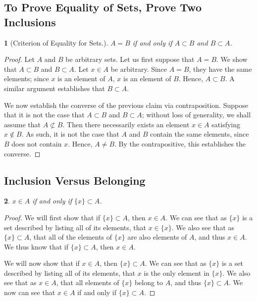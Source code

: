 \documentclass{book}
\newtheorem{majorEx}{}[section]
\begin{document}
			\subsection{To Prove Equality of Sets, Prove Two Inclusions}%
            	\begin{majorEx} %
                	[Criterion of Equality for Sets.]
                    $A = B$ if and only if $A \subset B$ and $B \subset A$.
                \end{majorEx}
                \begin{proof}
					Let $A$ and $B$ be arbitrary sets. Let us first suppose that $A = B$. We show that $A \subset B$ and $B \subset A$. Let $x \in A$ be arbitrary. Since $A = B$, they have the same elements; since $x$ is an element of $A$, $x$ is an element of $B$. Hence, $A \subset B$. A similar argument establishes that $B \subset A$.
                    
                    We now establish the converse of the previous claim via contraposition. Suppose that it is not the case that $A \subset B$ and $B \subset A$; without loss of generality, we shall assume that $A \not\subset B$. Then there necessarily exists an element $x \in A$ satisfying $x \notin B$. As such, it is not the case that $A$ and $B$ contain the same elements, since $B$ does not contain $x$. Hence, $A \ne B$. By the contrapositive, this establishes the converse.
				\end{proof}
			\subsection{Inclusion Versus Belonging}%
            \begin{majorEx}%
            $x \in A$ if and only if $\{x\} \subset A$.
            \end{majorEx}

\begin{proof} We will first show that if $\{x\} \subset A$, then $x \in A$. We can see that as $\{x\}$ is a set described by listing all of its elements, that $x \in \{x\}$. We also see that
as $\{x\} \subset A$, that all of the elements of $\{x\}$ are also elements of $A$, and thus $x \in A$. We thus know that if $\{x\} \subset A$, then $x \in A$.

We will now show that if $x \in A$, then $\{x\} \subset A$. We can see that as $\{x\}$ is a set described by listing all of its elements, that $x$ is the only element in $\{x\}$.
We also see that as $x \in A$, that all elements of $\{ x\}$ belong to $A$, and thus $\{x\} \subset A$. We now can see that $x \in A$ if and only if $\{x\} \subset A$.
\end{proof}
			
\end{document}
